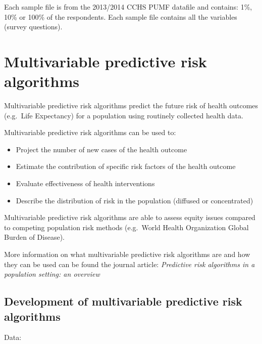 \documentclass[]{book}
\providecommand{\tightlist}{%
  \setlength{\itemsep}{0pt}\setlength{\parskip}{0pt}}
\begin{document}
Each sample file is from the 2013/2014 CCHS PUMF datafile and contains:
1\%, 10\% or 100\% of the respondents. Each sample file contains all the
variables (survey questions).

\section{Multivariable predictive risk
algorithms}\label{multivariable-predictive-risk-algorithms}

Multivariable predictive risk algorithms predict the future risk of
health outcomes (e.g.~Life Expectancy) for a population using routinely
collected health data.

Multivariable predictive risk algorithms can be used to:

\begin{itemize}
\tightlist
\item
  Project the number of new cases of the health outcome
\item
  Estimate the contribution of specific risk factors of the health
  outcome
\item
  Evaluate effectiveness of health interventions
\item
  Describe the distribution of risk in the population (diffused or
  concentrated)
\end{itemize}

Multivariable predictive risk algorithms are able to assess equity
issues compared to competing population risk methods (e.g.~World Health
Organization Global Burden of Disease).

More information on what multivariable predictive risk algorithms are
and how they can be used can be found the journal article:
\emph{Predictive risk algorithms in a population setting: an overview}
\citep{PoRTover}

\subsection{Development of multivariable predictive risk
algorithms}\label{development-of-multivariable-predictive-risk-algorithms}

Data:
\end{document}
